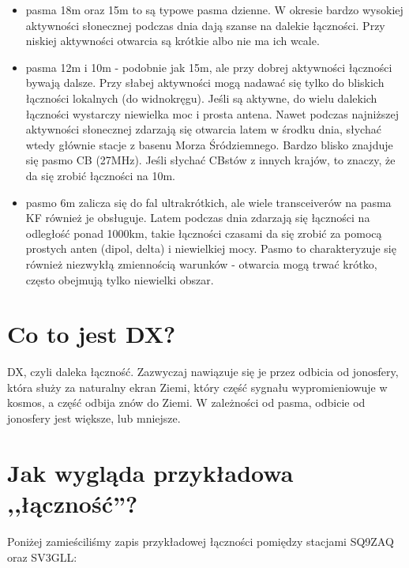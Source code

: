 \documentclass[a4paper,12pt]{article}
\begin{document}
\begin{itemize}
 \item pasma 18m oraz 15m to są typowe pasma dzienne. W okresie bardzo wysokiej aktywności słonecznej podczas dnia dają szanse na dalekie łączności. Przy niskiej aktywności otwarcia są krótkie albo nie ma ich wcale.
 \item pasma 12m i 10m - podobnie jak 15m, ale przy dobrej aktywności łączności bywają dalsze. Przy słabej aktywności mogą nadawać się tylko do bliskich łączności lokalnych (do widnokręgu). Jeśli są aktywne, do wielu dalekich łączności wystarczy niewielka moc i prosta antena. Nawet podczas najniższej aktywności słonecznej zdarzają się otwarcia latem w środku dnia, słychać wtedy głównie stacje z basenu Morza Śródziemnego. Bardzo blisko znajduje się pasmo CB (27MHz). Jeśli słychać CBstów z innych krajów, to znaczy, że da się zrobić łączności na 10m.
 \item pasmo 6m zalicza się do fal ultrakrótkich, ale wiele transceiverów na pasma KF również je obsługuje. Latem podczas dnia zdarzają się łączności na odległość ponad 1000km, takie łączności czasami da się zrobić za pomocą prostych anten (dipol, delta) i niewielkiej mocy. Pasmo to charakteryzuje się również niezwykłą zmiennością warunków - otwarcia mogą trwać krótko, często obejmują tylko niewielki obszar.
\end{itemize}


\section{Co to jest DX?}
DX, czyli daleka łączność. Zazwyczaj nawiązuje się je przez odbicia od jonosfery, która służy za naturalny ekran Ziemi, który część sygnału wypromieniowuje w kosmos, a część odbija znów do Ziemi. W zależności od pasma, odbicie od jonosfery jest większe, lub mniejsze.

\section{Jak wygląda przykładowa ,,łączność''?}
Poniżej zamieściliśmy zapis przykładowej łączności pomiędzy stacjami SQ9ZAQ oraz SV3GLL:
\end{document}
